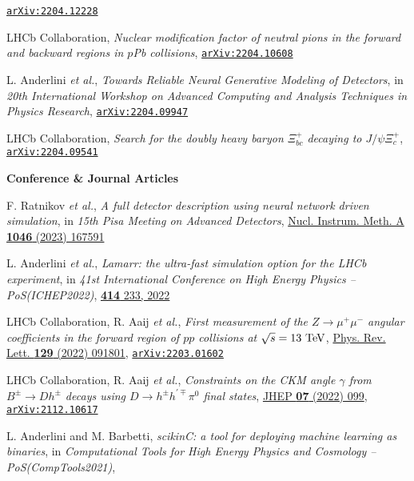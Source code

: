 \documentclass[a4paper, 11pt]{article}
\newenvironment{cvcontent}{
  \leftskip=0.5cm\rightskip=0cm
  \noindent\ignorespaces}{\par}
\newcommand{\journal}[1]{\textbf{\large #1}\\\vspace{-4mm}}
\newcommand{\arxiv}[1]{\href{https://arxiv.org/abs/#1}{\texttt{arXiv:#1}}}
\begin{document}
\begin{cvcontent}
\begin{enumerate}[label={[\arabic*]}, leftmargin=1.5cm]
    \arxiv{2204.12228}
    \item LHCb Collaboration,
    \emph{Nuclear modification factor of neutral pions in the forward and backward regions in $p$Pb collisions},
    \arxiv{2204.10608}
    \item L. Anderlini \emph{et al.},
    \emph{Towards Reliable Neural Generative Modeling of Detectors},
    in \emph{20th International Workshop on Advanced Computing and Analysis Techniques in Physics Research},
    \arxiv{2204.09947}
    \sloppy
    \item LHCb Collaboration,
    \emph{Search for the doubly heavy baryon $\Xi_{bc}^{+}$ decaying to $J/\psi \Xi_{c}^{+}$},
    \arxiv{2204.09541}
  \end{enumerate}
  \vspace{3mm}
  \journal{Conference \& Journal Articles}
  \begin{enumerate}[label={[\arabic*]}, leftmargin=1.5cm]
    \item F. Ratnikov \emph{et al.},
    \emph{A full detector description using neural network driven simulation},
    in \emph{15th Pisa Meeting on Advanced Detectors},
    \href{https://doi.org/10.1016/j.nima.2022.167591}{Nucl. Instrum. Meth. A \textbf{1046} (2023) 167591}
    \item L. Anderlini \emph{et al.},
    \emph{Lamarr: the ultra-fast simulation option for the LHCb experiment},
    in \emph{41st International Conference on High Energy Physics -- PoS(ICHEP2022)},
    \href{https://doi.org/10.22323/1.414.0233}{\textbf{414} 233, 2022}
    \item LHCb Collaboration, R. Aaij \emph{et al.},
    \emph{First measurement of the $Z\rightarrow \mu^+ \mu^-$ angular coefficients in the forward region of $pp$ collisions at $\sqrt{s}=13~\rm{TeV}$},
    \href{https://link.aps.org/doi/10.1103/PhysRevLett.129.091801}{Phys. Rev. Lett. \textbf{129} (2022) 091801},
    \arxiv{2203.01602}
    \item LHCb Collaboration, R. Aaij \emph{et al.}, 
    \emph{Constraints on the CKM angle $\gamma$ from $B^\pm \rightarrow Dh^\pm$ decays using $D \rightarrow h^\pm h^{\prime\mp}\pi^0$ final states},
    \href{https://doi.org/10.1007/JHEP07(2022)099}{JHEP \textbf{07} (2022) 099},
    \arxiv{2112.10617}
    \item L. Anderlini and M. Barbetti, 
    \emph{scikinC: a tool for deploying machine learning as binaries}, 
    in \emph{Computational Tools for High Energy Physics and Cosmology -- PoS(CompTools2021)}, 

\end{enumerate}
\end{cvcontent}
\end{document}
